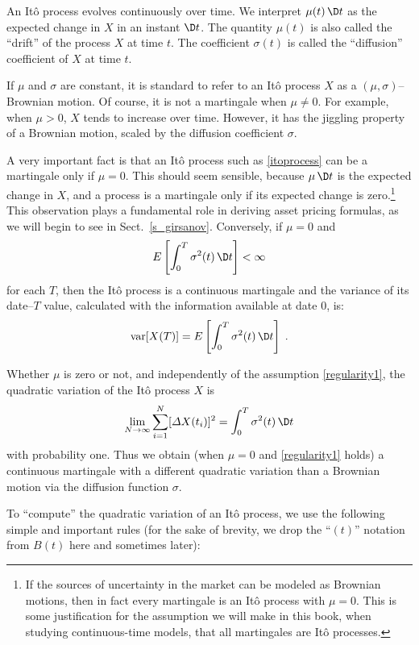 An It\^o process evolves continuously over time.  We interpret $\mu(t)\,\D t$ as the expected change in $X$ in an instant $\D t$.  The quantity $\mu(t)$  is also called the ``drift'' of the process $X$ at time $t$.    The coefficient $\sigma(t)$ is called the ``diffusion'' coefficient of $X$ at time $t$.  

If $\mu$ and $\sigma$ are constant, it is standard to refer to an It\^o process $X$ as a $(\mu,\sigma)$--Brownian motion.  Of course, it is not a martingale when $\mu\neq 0$.  For example, when $\mu>0$, $X$ tends to increase over time.  However, it has the jiggling property of a Brownian motion, scaled by the diffusion coefficient $\sigma$. 

A very important fact is that an It\^o process such as \eqref{itoprocess} can be a martingale only if $\mu=0$.  This should seem sensible, because $\mu\,\D t$ is the expected change in $X$, and a process is a martingale only if its expected change is zero.\footnote{If the sources of uncertainty in the market can be modeled as Brownian motions, then in fact every martingale is an It\^o process with $\mu=0$.  This is some justification for the assumption we will make in this book, when studying continuous-time models, that all martingales are It\^o processes.}   This observation plays a fundamental role in deriving asset pricing formulas, as we will begin to see in Sect.~\ref{s_girsanov}.
Conversely, if $\mu=0$ and 
\begin{equation}\label{regularity1}
E \left[\int_0^T \sigma^2(t)\,\D t\right] < \infty
\end{equation}
for each $T$,  
then the It\^o process is a continuous martingale and the variance of its date--$T$ value, calculated with the information available at date 0, is:
$$\var[X(T)] = E \left[\int_0^T \sigma^2(t)\,\D t\right]\; .$$  

Whether $\mu$ is zero or not, and independently of the assumption \eqref{regularity1}, the quadratic variation of the It\^o process $X$ is 
\begin{equation}\label{itoquadraticvariation}
\lim_{N \rightarrow \infty} \sum_{i=1}^N[\varDelta X(t_i)]^2 = \int_0^T \sigma^2(t)\,\D t
\end{equation}
with probability one.  Thus we obtain (when $\mu=0$ and \eqref{regularity1} holds) a continuous martingale with a different quadratic variation than a Brownian motion via the diffusion function $\sigma$.

To ``compute'' the quadratic variation of an It\^o process, we use the following simple and important rules (for the sake of brevity, we drop the ``$(t)$'' notation from $B(t)$ here and sometimes later):

